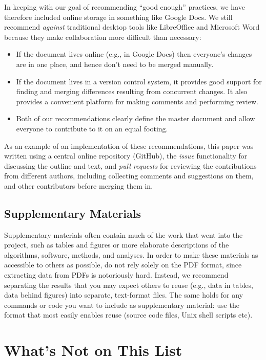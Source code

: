 \documentclass[10pt]{article}
\begin{document}
In keeping with our goal of recommending ``good enough'' practices, we
have therefore included online storage in something like Google Docs. We
still recommend \emph{against} traditional desktop tools like
LibreOffice and Microsoft Word because they make collaboration more
difficult than necessary:

\begin{itemize}
\item
  If the document lives online (e.g., in Google Docs) then everyone's
  changes are in one place, and hence don't need to be merged manually.
\item
  If the document lives in a version control system, it provides good
  support for finding and merging differences resulting from concurrent
  changes. It also provides a convenient platform for making comments
  and performing review.
\item
  Both of our recommendations clearly define the master document and
  allow everyone to contribute to it on an equal footing.
\end{itemize}

As an example of an implementation of these recommendations, this paper
was written using a central online repository (GitHub), the \emph{issue}
functionality for discussing the outline and text, and \emph{pull
requests} for reviewing the contributions from different authors,
including collecting comments and suggestions on them, and other
contributors before merging them in.

\subsection*{Supplementary Materials}

Supplementary materials often contain much of the work that went into
the project, such as tables and figures or more elaborate descriptions
of the algorithms, software, methods, and analyses. In order to make
these materials as accessible to others as possible, do not rely solely
on the PDF format, since extracting data from PDFs is notoriously hard.
Instead, we recommend separating the results that you may expect others
to reuse (e.g., data in tables, data behind figures) into separate,
text-format files. The same holds for any commands or code you want to
include as supplementary material: use the format that most easily
enables reuse (source code files, Unix shell scripts etc).

\section{What's Not on This List}\label{whats-not-on-this-list}
\end{document}
